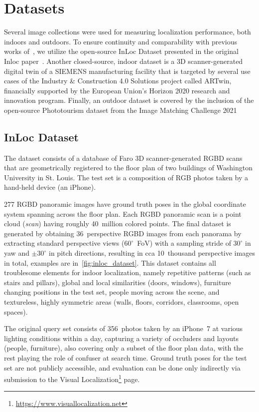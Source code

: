 \section{Datasets}

Several image collections were used for measuring localization performance, both indoors
and outdoors. To ensure continuity and comparability with previous works of~\citet{InLoc,
Bastien}, we utilize the open-source InLoc Dataset presented in the original Inloc
paper~\citep{InLoc}. Another closed-source, indoor dataset is a 3D scanner-generated
digital twin of a SIEMENS manufacturing facility that is targeted by several use cases of
the Industry \& Construction 4.0 Solutions project called ARTwin, financially supported by
the European Union's Horizon 2020 research and innovation program. Finally, an outdoor
dataset is covered by the inclusion of the open-source Phototourism dataset from the Image
Matching Challenge
2021

\subsection{InLoc Dataset}

The dataset consists of a database of Faro 3D scanner-generated RGBD scans that are
geometrically registered to the floor plan of two buildings of Washington University in
St. Louis. The test set is a composition of RGB photos taken by a hand-held device (an
iPhone).

277 RGBD panoramic images have ground truth poses in the global coordinate system spanning
across the floor plan. Each RGBD panoramic scan is a point cloud (\emph{scan}) having
roughly 40~million colored points. The final dataset is generated by obtaining
36~perspective RGBD images from each panorama by extracting standard perspective views
($60^{\circ}$~FoV) with a sampling stride of $30^{\circ}$ in yaw and $\pm30^{\circ}$ in
pitch directions, resulting in cca 10~thousand perspective images in total, examples are
in~\cref{fig:inloc_dataset}. This dataset contains all troublesome elements for indoor
localization, namely repetitive patterns (such as stairs and pillars), global and local
similarities (doors, windows), furniture changing positions in the test set, people moving
across the scene, and textureless, highly symmetric areas (walls, floors, corridors,
classrooms, open spaces).

The original query set consists of 356~photos taken by an iPhone~7 at various lighting
conditions within a day, capturing a variety of occluders and layouts (people, furniture),
also covering only a subset of the floor plan data, with the rest playing the role of
confuser at search time. Ground truth poses for the test set are not publicly accessible,
and evaluation can be done only indirectly via submission to the Visual
Localization\footnote{\url{https://www.visuallocalization.net}} page.

